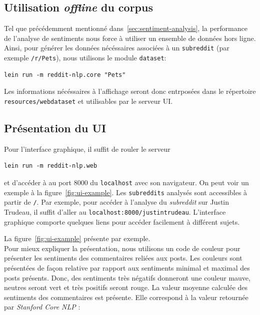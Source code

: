 \documentclass[12pt]{article}
\begin{document}
\subsection{Utilisation \textit{offline} du corpus}
Tel que précédemment mentionné dans~\ref{sec:sentiment-analysis}, la performance de l'analyse de sentiments nous force à utiliser un ensemble de données hors ligne. Ainsi, pour générer les données nécéssaires associées à un \verb;subreddit; (par exemple \verb;/r/Pets;), nous utilisons le module \verb;dataset;:

\begin{verbatim}
lein run -m reddit-nlp.core "Pets"
\end{verbatim}

Les informations nécéssaires à l'affichage seront donc entrposées dans le répertoire \verb;resources/webdataset; et utilisables par le serveur UI.

\subsection{Présentation du UI}

Pour l'interface graphique, il suffit de rouler le serveur

\begin{verbatim}
lein run -m reddit-nlp.web
\end{verbatim}

et d'accéder à au port 8000 du \verb;localhost; avec son navigateur. On peut voir un exemple à la figure~\ref{fig:ui-example}. Les \verb;subreddits; analysés sont accessibles à partir de \verb;/;. Par exemple, pour accéder à l'analyse du \emph{subreddit} sur Justin Trudeau, il suffit d'aller au \verb;localhost:8000/justintrudeau;.
L'interface graphique comporte quelques liens pour accéder facilement à différent sujets.

La figure~\ref{fig:ui-example} présente par exemple. \\

Pour mieux expliquer la présentation, nous utilisons un code de couleur pour présenter les sentiments des commentaires reliées aux posts. Les couleurs sont présentées de façon relative par rapport aux sentiments minimal et maximal des posts présents. Donc, des sentiments très négatifs donneront une couleur mauve, neutres seront vert et très positifs seront rouge. La valeur moyenne calculée des sentiments des commentaires est présente. Elle correspond à la valeur retournée par \textit{Stanford Core NLP} :
\end{document}
